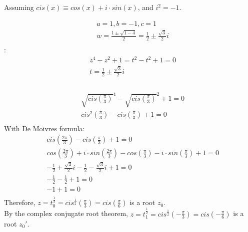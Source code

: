 \documentclass{myassignment}
\begin{document}
	Assuming $cis(x) \equiv cos(x) + i\cdot sin(x)$, and $i^2=-1$.
	\begin{answer}
		\begin{eqnarray}
			&a = 1, b = -1, c = 1 \\
			&w = \frac{1\pm\sqrt{1-4}}{2} = \frac{1}{2}\pm\frac{\sqrt{3}}{2}i\\
		\end{eqnarray}
		:\\
		\begin{eqnarray}
			&z^4 - z^2 + 1 = t^2-t^2+1 = 0\\
			&t = {\frac{1}{2}\pm\frac{\sqrt{3}}{2}i}\\
		\end{eqnarray}
		\\
		\begin{eqnarray}
			&\sqrt{cis(\frac{\pi}{3})}^4 - \sqrt{cis(\frac{\pi}{3})}^2 + 1 = 0\\
			&cis^2(\frac{\pi}{3}) - cis(\frac{\pi}{3}) + 1 = 0\\
		\end{eqnarray}
		With De Moivres formula:
		\begin{eqnarray}
			&cis(\frac{2\pi}{3}) - cis(\frac{\pi}{3}) + 1 = 0\\
			&cos(\frac{2\pi}{3}) + i\cdot sin(\frac{2\pi}{3}) - cos(\frac{\pi}{3}) - i\cdot sin(\frac{\pi}{3}) + 1 = 0\\
			&-\frac{1}{2} + \frac{\sqrt{3}}{2}i - \frac{1}{2} - \frac{\sqrt{3}}{2} i + 1 = 0\\
			&-\frac{1}{2} - \frac{1}{2} + 1 = 0\\
			&-1 + 1 = 0\\
		\end{eqnarray}
		Therefore, $z = t_0^{\frac{1}{2}} = cis^{\frac{1}{2}}(\frac{\pi}{3}) = cis(\frac{\pi}{6})$ is a root $z_0$.\\
		By the complex conjugate root theorem, $z=t_1^{\frac{1}{2}}=cis^{\frac{1}{2}}(-\frac{\pi}{3})=cis(-\frac{\pi}{6})$ is a root $z_0'$.\\


\end{answer}
\end{document}
